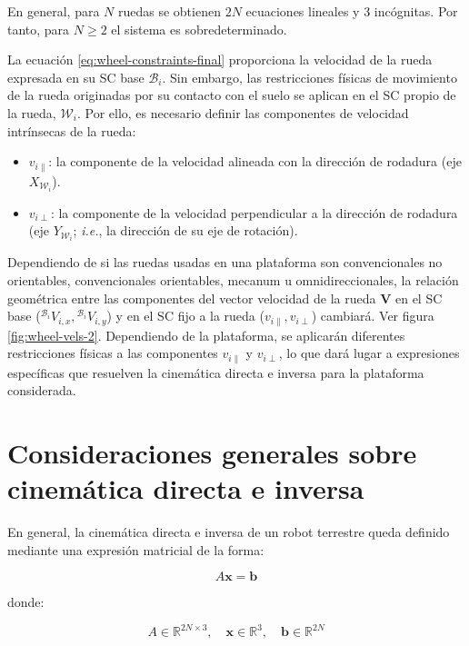 \documentclass[11pt,a4paper]{article}
\newcommand{\vect}[1]{\bm{#1}}       %
\newcommand{\frameBi}{\mathcal{B}_i}
\newcommand{\frameWi}{\mathcal{W}_i}
\newcommand{\ejeXWi}{X_{\frameWi}}
\newcommand{\ejeYWi}{Y_{\frameWi}}
\begin{document}
En general, para \(N\) ruedas se obtienen \(2N\) ecuaciones lineales y 3 incógnitas. Por tanto, para \(N \ge 2\) el sistema es sobredeterminado.

La ecuación \ref{eq:wheel-constraints-final} proporciona la velocidad de la rueda expresada en su SC base \(\frameBi\). Sin embargo, las restricciones físicas de movimiento de la rueda originadas por su contacto con el suelo se aplican en el SC propio de la rueda, \(\frameWi\). Por ello, es necesario definir las componentes de velocidad intrínsecas de la rueda:

\begin{itemize}
    \item \(v_{i\parallel}\): la componente de la velocidad alineada con la dirección de rodadura (eje \(\ejeXWi\)).
    \item \(v_{i\perp}\): la componente de la velocidad perpendicular a la dirección de rodadura (eje \(\ejeYWi\); \textit{i.e.}, la dirección de su eje de rotación).
\end{itemize}

Dependiendo de si las ruedas usadas en una plataforma son convencionales no orientables, convencionales orientables, mecanum u omnidireccionales, la relación geométrica entre las componentes del vector velocidad de la rueda \(\vect{V}\) en el SC base (\({}^{\frameBi}V_{i,x}, {}^{\frameBi}V_{i,y}\)) y en el SC fijo a la rueda (\(v_{i\parallel}, v_{i\perp}\)) cambiará. Ver figura \ref{fig:wheel-vels-2}. Dependiendo de la plataforma, se aplicarán diferentes restricciones físicas a las componentes \(v_{i\parallel}\) y \(v_{i\perp}\), lo que dará lugar a expresiones específicas que resuelven la cinemática directa e inversa para la plataforma considerada.

\section{Consideraciones generales sobre cinemática directa e inversa}
\label{sec:general-considerations}

En general, la cinemática directa e inversa de un robot terrestre queda definido mediante una expresión matricial de la forma:

\begin{equation}
    A\mathbf{x}=\mathbf{b}
\end{equation}

donde:

\[
    A \in \mathbb{R}^{2N \times 3}, \quad \mathbf{x} \in \mathbb{R}^3, \quad \mathbf{b} \in \mathbb{R}^{2N}
\]
\end{document}
